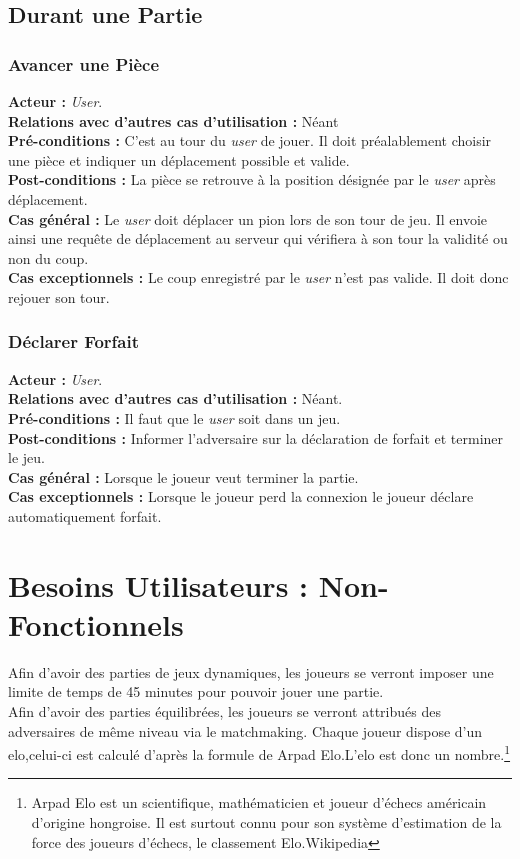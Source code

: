 \documentclass[10pt, a4paper]{article}
\begin{document}
\subsection{Durant une Partie}

\subsubsection{Avancer une Pièce}
\textbf{Acteur :} \textit{User}.\\
\textbf{Relations avec d'autres cas d'utilisation :} Néant \\
\textbf{Pré-conditions :} C'est au tour du \textit{user} de jouer. Il doit préalablement choisir une pièce et indiquer un déplacement possible et valide. \\
\textbf{Post-conditions :} La pièce se retrouve à la position désignée par le \textit{user} après déplacement. \\
\textbf{Cas général :} Le \textit{user} doit déplacer un pion lors de son tour de jeu. Il envoie ainsi une requête de déplacement au serveur qui vérifiera à son tour la validité ou non du coup. \\
\textbf{Cas exceptionnels :} Le coup enregistré par le \textit{user} n'est pas valide. Il doit donc rejouer son tour. \\

\subsubsection{Déclarer Forfait}
\textbf{Acteur :} \textit{User}.\\
\textbf{Relations avec d'autres cas d'utilisation :} Néant.\\
\textbf{Pré-conditions :} Il faut que le \textit{user} soit dans un jeu. \\
\textbf{Post-conditions :} Informer l'adversaire sur la déclaration de forfait et terminer le jeu.\\
\textbf{Cas général :} Lorsque le joueur veut terminer la partie.\\
\textbf{Cas exceptionnels :} Lorsque le joueur perd la connexion le joueur déclare automatiquement forfait. %

\section{Besoins Utilisateurs : Non-Fonctionnels}
Afin d'avoir des parties de jeux dynamiques, les joueurs se verront imposer une limite de temps de 45 minutes pour pouvoir jouer une partie. \\
Afin d'avoir des parties équilibrées, les joueurs se verront attribués des adversaires de même niveau via le matchmaking. Chaque joueur dispose d'un elo,celui-ci est calculé d'après la formule de Arpad Elo.L'elo est donc un nombre.\footnote{Arpad Elo est un scientifique, mathématicien et joueur d'échecs américain d'origine hongroise. Il est surtout connu pour son système d'estimation de la force des joueurs d'échecs, le classement Elo.Wikipedia}
\end{document}
